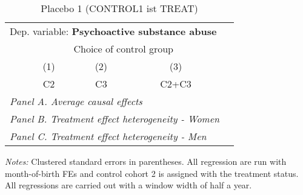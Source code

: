  \begin{table}[H] \centering \begin{threeparttable} \caption{Placebo 1 (CONTROL1 ist TREAT) } {\def\sym#1{\ifmmode^{#1}\else\(^{#1}\)\fi} \begin{tabular}{l*{4}{c}} \toprule \multicolumn{4}{l}{Dep. variable: \textbf{Psychoactive substance abuse}} \\ & \multicolumn{3}{c}{Choice of control group} \\ \cmidrule(lr){2-4}
            &\multicolumn{1}{c}{(1)}&\multicolumn{1}{c}{(2)}&\multicolumn{1}{c}{(3)}\\
            &\multicolumn{1}{c}{C2}&\multicolumn{1}{c}{C3}&\multicolumn{1}{c}{C2+C3}\\
\midrule
 \multicolumn{4}{l}{\emph{Panel A. Average causal effects}} \\      \midrule\multicolumn{4}{l}{\emph{Panel B. Treatment effect heterogeneity - Women}} \\      \midrule\multicolumn{4}{l}{\emph{Panel C. Treatment effect heterogeneity - Men}} \\      
\bottomrule \end{tabular} } \begin{tablenotes} \item \scriptsize \emph{Notes:} Clustered standard errors in parentheses. All regression are run with month-of-birth FEs and control cohort 2 is assigned with the treatment status. All regressions are carried out with a window width of half a year. \end{tablenotes} \end{threeparttable} \end{table} 
